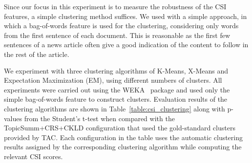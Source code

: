 Since our focus in this experiment is to measure the robustness of the CSI features, a simple clustering method suffices.  We used with a simple approach, in which a bag-of-words feature is used for the clustering, considering only words from the first sentence of each document. This is reasonable as the first few sentences of a news article often give a good indication of the content to follow in the rest of the article. 


We experiment with three clustering algorithms of K-Means, X-Means and Expectation Maximization (EM), using different numbers of clusters. All experiments were carried out using the WEKA~\cite{weka} package and used only the simple bag-of-words feature to construct clusters. Evaluation results of the clustering algorithms are shown in Table~\ref{table:csi_clustering} along with p-values from the 
Student's t-test when compared with the TopicSumm+CRS+CKLD configuration that used the gold-standard clusters provided by TAC. Each configuration in the table uses the automatic clustering results assigned by the corresponding clustering algorithm while computing the relevant CSI scores.

